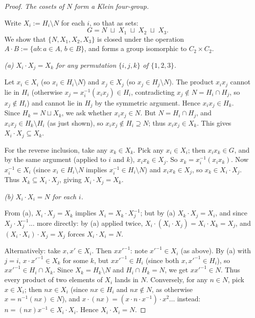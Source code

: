 \documentclass[12pt, a4paper]{article}
\theoremstyle{plain}
\theoremstyle{definition}
\begin{document}
\begin{proof}
\medskip
\noindent\textit{The cosets of $N$ form a Klein four-group.}

Write $X_i := H_i \setminus N$ for each $i$, so that as sets:
\[
  G = N \;\sqcup\; X_1 \;\sqcup\; X_2 \;\sqcup\; X_3.
\]
We show that $\{N, X_1, X_2, X_3\}$ is closed under the operation
$A \cdot B := \{ab : a \in A,\, b \in B\}$, and forms a group isomorphic
to $C_2 \times C_2$.

\smallskip
\noindent\textit{(a) $X_i \cdot X_j = X_k$ for any permutation $\{i,j,k\}$
of $\{1,2,3\}$.}

Let $x_i \in X_i$ (so $x_i \in H_i \setminus N$) and $x_j \in X_j$
(so $x_j \in H_j \setminus N$). The product $x_i x_j$ cannot lie in $H_i$
(otherwise $x_j = x_i^{-1}(x_ix_j) \in H_i$, contradicting $x_j \notin N
= H_i \cap H_j$, so $x_j \notin H_i$) and cannot lie in $H_j$ by the
symmetric argument. Hence $x_ix_j \in H_k$. Since $H_k = N \sqcup X_k$,
we ask whether $x_ix_j \in N$. But $N = H_i\cap H_j$, and $x_ix_j \in H_k
\setminus H_i$ (as just shown), so $x_ix_j \notin H_i \supseteq N$; thus
$x_ix_j \in X_k$. This gives $X_i \cdot X_j \subseteq X_k$.

For the reverse inclusion, take any $x_k \in X_k$. Pick any $x_i \in X_i$;
then $x_i x_k \in G$, and by the same argument (applied to $i$ and $k$),
$x_i x_k \in X_j$. So $x_k = x_i^{-1}(x_i x_k)$. Now $x_i^{-1} \in X_i$
(since $x_i \in H_i\setminus N$ implies $x_i^{-1}\in H_i\setminus N$) and
$x_i x_k \in X_j$, so $x_k \in X_i \cdot X_j$. Thus $X_k \subseteq X_i
\cdot X_j$, giving $X_i \cdot X_j = X_k$.

\smallskip
\noindent\textit{(b) $X_i \cdot X_i = N$ for each $i$.}

From (a), $X_i \cdot X_j = X_k$ implies $X_i = X_k \cdot X_j^{-1}$;
but by (a) $X_k \cdot X_j = X_i$, and since $X_j \cdot X_j^{-1}$... more
directly: by (a) applied twice, $X_i\cdot(X_i \cdot X_j) = X_i \cdot X_k
= X_j$, and $(X_i\cdot X_i)\cdot X_j = X_j$ forces $X_i\cdot X_i = N$.

Alternatively: take $x, x' \in X_i$. Then $xx'^{-1}$: note $x'^{-1}\in X_i$
(as above). By (a) with $j = i$, $x\cdot x'^{-1} \in X_k$ for some $k$, but
$xx'^{-1} \in H_i$ (since both $x, x'^{-1} \in H_i$), so $xx'^{-1}\in H_i\cap
X_k$. Since $X_k = H_k\setminus N$ and $H_i\cap H_k = N$, we get $xx'^{-1}
\in N$. Thus every product of two elements of $X_i$ lands in $N$.
Conversely, for any $n\in N$, pick $x\in X_i$; then $nx \in X_i$ (since
$nx \in H_i$ and $nx\notin N$, as otherwise $x = n^{-1}(nx)\in N$), and
$x\cdot(nx) = (x\cdot n\cdot x^{-1})\cdot x^2$... instead: $n = (nx)x^{-1}
\in X_i\cdot X_i$. Hence $X_i\cdot X_i = N$.




\end{proof}
\end{document}
